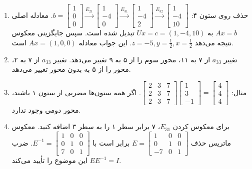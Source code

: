 \documentclass[12pt]{article}
\begin{document}
\begin{enumerate}
		\item حذف روی ستون ۴: $b= \begin{bmatrix} 1 \\ 0 \\ 0 \end{bmatrix} \xrightarrow{E_{21}} \begin{bmatrix} 1 \\ -4 \\ 0 \end{bmatrix} \xrightarrow{E_{31}} \begin{bmatrix} 1 \\ -4 \\ 2 \end{bmatrix} \xrightarrow{E_{32}} \begin{bmatrix} 1 \\ -4 \\ 10 \end{bmatrix}$. معادله اصلی $Ax=b$ به $Ux=c=(1,-4,10)$ تبدیل شده است. سپس جایگزینی معکوس نتیجه می‌دهد $z=-5, y=\frac{1}{2}, x=\frac{1}{2}$. این جواب معادله $Ax=(1,0,0)$ است.
		
		\item تغییر $a_{33}$ از ۷ به ۱۱، محور سوم را از ۵ به ۹ تغییر می‌دهد. تغییر $a_{33}$ از ۷ به ۲، محور را از ۵ به بدون محور تغییر می‌دهد.
		
		\item مثال: $\begin{bmatrix} 2 & 3 & 7 \\ 2 & 3 & 7 \\ 2 & 3 & 7 \end{bmatrix} \begin{bmatrix} 1 \\ 3 \\ -1 \end{bmatrix} = \begin{bmatrix} 4 \\ 4 \\ 4 \end{bmatrix}$. اگر همه ستون‌ها مضربی از ستون ۱ باشند، محور دومی وجود ندارد.
		
		\item برای معکوس کردن $E_{31}$، ۷ برابر سطر ۱ را به سطر ۳ اضافه کنید. معکوس ماتریس حذف $E= \begin{bmatrix} 1 & 0 & 0 \\ 0 & 1 & 0 \\ -7 & 0 & 1 \end{bmatrix}$ برابر است با $E^{-1}= \begin{bmatrix} 1 & 0 & 0 \\ 0 & 1 & 0 \\ 7 & 0 & 1 \end{bmatrix}$. ضرب $EE^{-1}=I$ این موضوع را تأیید می‌کند.
		

\end{enumerate}
\end{document}
